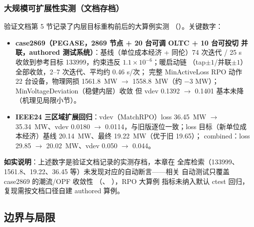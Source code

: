 \subsubsection*{大规模可扩展性实测（文档存档）}
验证文档第 5 节记录了内层目标重构前后的大算例实测
（）。关键数字：
\begin{itemize}
  \item \textbf{case2869（PEGASE，2869 节点 + 20 台可调 OLTC + 10 台可投切
        并联，authored 测试系统）}：基线（单位成本经济 + 同伦）74 次迭代 /
        25 s 收敛到参考目标 133999，约束违反 $1.1\times10^{-6}$；暖启动链
        （tap$\pm1$/并联$\pm1$）全部收敛，2--7 次迭代、平均约 0.46 s/次；
        完整 MinActiveLoss RPO 动作 22 台设备，物理网损 1561.8~MW
        $\to$ 1558.8~MW（约 $-3$ MW）；MinVoltageDeviation（稳健内层）收敛
        但 vdev 0.1392 $\to$ 0.1401 基本未降（机理见局限小节）。
  \item \textbf{IEEE24 三区域扩展回归}：vdev（MatchRPO）loss 36.45~MW
        $\to$ 35.34~MW、vdev 0.0180 $\to$ 0.0114，与旧版逐位一致；loss
        目标（新单位成本经济）基线 20.14~MW、最终 19.22~MW（优于旧 19.65）；
        combined：loss 29.85 $\to$ 20.02~MW、vdev 0.050 $\to$ 0.044。
\end{itemize}
\textbf{如实说明}：上述数字是验证文档记录的实测存档，本章在 
全库检索（133999、1561.8、19.22、36.45 等）未发现对应的自动断言——相关
自动测试只覆盖 case2869 的潮流/OPF 收敛性
（、
），RPO 大算例
指标未纳入默认 ctest 回归，复现需按文档口径自建 authored 算例。

\subsection{边界与局限}

